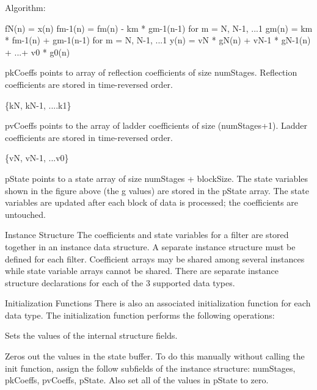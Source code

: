 \begin{DoxyParagraph}{Algorithm\+:}
 
\begin{DoxyPre}
     fN(n)   =  x(n)
     fm-1(n) = fm(n) - km * gm-1(n-1)   for m = N, N-1, ...1
     gm(n)   = km * fm-1(n) + gm-1(n-1) for m = N, N-1, ...1
     y(n)    = vN * gN(n) + vN-1 * gN-1(n) + ...+ v0 * g0(n)
  \end{DoxyPre}
 
\end{DoxyParagraph}
\begin{DoxyParagraph}{}
{\ttfamily pk\+Coeffs} points to array of reflection coefficients of size {\ttfamily num\+Stages}. Reflection coefficients are stored in time-\/reversed order. 
\end{DoxyParagraph}
\begin{DoxyParagraph}{}

\begin{DoxyPre}
     \{kN, kN-1, ....k1\}
  \end{DoxyPre}
 {\ttfamily pv\+Coeffs} points to the array of ladder coefficients of size {\ttfamily (num\+Stages+1)}. Ladder coefficients are stored in time-\/reversed order. 
\end{DoxyParagraph}
\begin{DoxyParagraph}{}

\begin{DoxyPre}
     \{vN, vN-1, ...v0\}
  \end{DoxyPre}
 {\ttfamily p\+State} points to a state array of size {\ttfamily num\+Stages + block\+Size}. The state variables shown in the figure above (the g values) are stored in the {\ttfamily p\+State} array. The state variables are updated after each block of data is processed; the coefficients are untouched. 
\end{DoxyParagraph}
\begin{DoxyParagraph}{Instance Structure}
The coefficients and state variables for a filter are stored together in an instance data structure. A separate instance structure must be defined for each filter. Coefficient arrays may be shared among several instances while state variable arrays cannot be shared. There are separate instance structure declarations for each of the 3 supported data types.
\end{DoxyParagraph}
\begin{DoxyParagraph}{Initialization Functions}
There is also an associated initialization function for each data type. The initialization function performs the following operations\+:
\begin{DoxyItemize}
\item Sets the values of the internal structure fields.
\item Zeros out the values in the state buffer. To do this manually without calling the init function, assign the follow subfields of the instance structure\+: num\+Stages, pk\+Coeffs, pv\+Coeffs, p\+State. Also set all of the values in p\+State to zero.
\end{DoxyItemize}
\end{DoxyParagraph}
